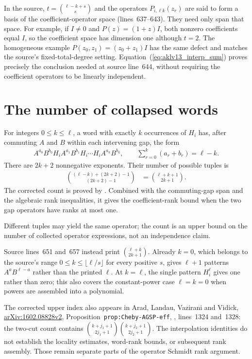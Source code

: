 \documentclass{article}
\begin{document}
In the source, $t=\binom{\ell-k+s}{s}$ and the operators
$P_{i,\ell k}(z_r)$ are said to form a basis of the coefficient-operator
space (lines~637--643). They need only span that space.
For example, if $I\ne0$ and $P(z)=(1+z)I$, both nonzero coefficients equal
$I$, so the coefficient space has dimension one although $t=2$.
The homogeneous example $P(z_0,z_1)=(z_0+z_1)I$ has the same defect and
matches the source's fixed-total-degree setting.
Equation~(\ref{eq:aklv13_interp_sum})
proves precisely the conclusion needed at source line~644, without
requiring the coefficient operators to be linearly independent.

\section{The number of collapsed words}

For integers $0\le k\le\ell$, a word with exactly $k$ occurrences of $H_i$
has, after commuting $A$ and $B$ within each intervening gap, the form
\begin{align}
    A^{a_0}B^{b_0}H_i A^{a_1}B^{b_1}H_i\cdots H_i A^{a_k}B^{b_k},
    \qquad \sum_{r=0}^{k}(a_r+b_r)=\ell-k.
    \label{eq:aklv13_word_form}
\end{align}
There are $2k+2$ nonnegative exponents. Their number of possible tuples is
\begin{align}
    \binom{(\ell-k)+(2k+2)-1}{(2k+2)-1}
        &=\binom{\ell+k+1}{2k+1}.
    \label{eq:aklv13_word_count}
\end{align}
The corrected count is proved by
. Combined with the commuting-gap
span and the algebraic rank inequalities, it gives the coefficient-rank bound
 when the two
gap operators have ranks at most one.

Different tuples may yield the same operator; the count is an upper bound
on the number of collected operator expressions, not an independence claim.

Source lines~651 and~657 instead print $\binom{\ell+k}{2k+1}$.
Already $k=0$, which belongs to the source's range
$0\le k\le\lfloor\ell/s\rfloor$ for every positive $s$, gives $\ell+1$
patterns $A^aB^{\ell-a}$ rather than the printed $\ell$.
At $k=\ell$, the single pattern $H_i^\ell$ gives one rather than zero;
this also covers the constant-power case $\ell=k=0$ when powers are
assembled into a polynomial.

The corrected upper index also appears in Arad, Landau, Vazirani and
Vidick, \href{https://arxiv.org/abs/1602.08828v2}{arXiv:1602.08828v2},
Proposition~\texttt{prop:Cheby-AGSP-eff},
, lines~1324 and~1328:
the two-cut count contains
$\binom{k+j_1+1}{2j_1+1}\binom{k+j_2+1}{2j_2+1}$.
The interpolation identities do not establish the locality estimates,
word-rank bounds, or subsequent rank assembly. Those remain separate
parts of the operator Schmidt rank argument.
\end{document}
